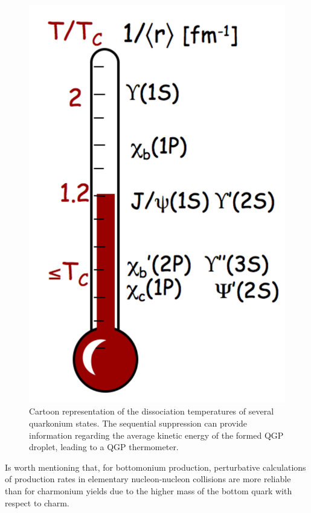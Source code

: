 

\begin{figure}[!t]
\begin{center}
\includegraphics[width=0.3\linewidth]{Chapters/Introduction/Figs/thermometer.pdf}
\caption{Cartoon representation of the dissociation temperatures of several quarkonium states. The sequential suppression can provide information regarding the average kinetic energy of the formed QGP droplet, leading to a QGP thermometer.}
\label{fig:QGP_thermo}
\end{center}
\end{figure}

Is worth mentioning that, for bottomonium production, perturbative calculations of production rates in elementary nucleon-nucleon collisions are more reliable than for charmonium yields due to the higher mass of the bottom quark with respect to charm. 

